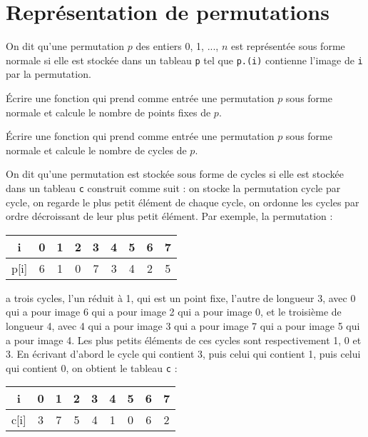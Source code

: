 \renewcommand{\SourceFile}{1-parcours-de-tableaux/src/1-6.ml}

\section{Représentation de permutations}

On dit qu'une permutation $p$ des entiers 0, 1, ..., $n$ est représentée sous forme normale si elle est stockée dans un tableau \texttt{p} tel que \texttt{p.(i)} contienne l'image de \texttt{i} par la permutation.

\Q
Écrire une fonction qui prend comme entrée une permutation $p$ sous forme normale et calcule le nombre de points fixes de $p$.

\Q
Écrire une fonction qui prend comme entrée une permutation $p$ sous forme normale et calcule le nombre de cycles de $p$.

\Q
On dit qu'une permutation est stockée sous forme de cycles si elle est stockée dans un tableau \texttt{c} construit comme suit : on stocke la permutation cycle par cycle, on regarde le plus petit élément de chaque cycle, on ordonne les cycles par ordre décroissant de leur plus petit élément. Par exemple, la permutation :

\begin{center}
    \begin{tabular}{ |c|c|c|c|c|c|c|c|c| }
        \hline
        i & 0 & 1 & 2 & 3 & 4 & 5 & 6 & 7 \\
        \hline
        p[i] & 6 & 1 & 0 & 7 & 3 & 4 & 2 & 5 \\
        \hline
       \end{tabular}
\end{center}

a trois cycles, l'un réduit à 1, qui est un point fixe, l'autre de longueur 3, avec 0 qui a pour image 6 qui a pour image 2 qui a pour image 0, et le troisième de longueur 4, avec 4 qui a pour image 3 qui a pour image 7 qui a pour image 5 qui a pour image 4. Les plus petits éléments de ces cycles sont respectivement 1, 0 et 3. En écrivant d'abord le cycle qui contient 3, puis celui qui contient 1, puis celui qui contient 0, on obtient le tableau \texttt{c} :

\begin{center}
    \begin{tabular}{ |c|c|c|c|c|c|c|c|c| }
        \hline
        i & 0 & 1 & 2 & 3 & 4 & 5 & 6 & 7 \\
        \hline
        c[i] & 3 & 7 & 5 & 4 & 1 & 0 & 6 & 2 \\
        \hline
       \end{tabular}
\end{center}

